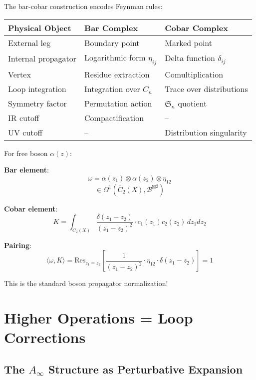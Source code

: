 \begin{theorem}
The bar-cobar construction encodes Feynman rules:

\begin{center}
\begin{tabular}{|l|l|l|}
\hline
\textbf{Physical Object} & \textbf{Bar Complex} & \textbf{Cobar Complex} \\
\hline
External leg & Boundary point & Marked point \\
Internal propagator & Logarithmic form $\eta_{ij}$ & Delta function $\delta_{ij}$ \\
Vertex & Residue extraction & Comultiplication \\
Loop integration & Integration over $C_n$ & Trace over distributions \\
Symmetry factor & Permutation action & $\mathfrak{S}_n$ quotient \\
IR cutoff & Compactification & -- \\
UV cutoff & -- & Distribution singularity \\
\hline
\end{tabular}
\end{center}
\end{theorem}

\begin{example}
For free boson $\alpha(z)$:

\textbf{Bar element}:
$$\omega = \alpha(z_1) \otimes \alpha(z_2) \otimes \eta_{12}$$
$$\in \Omega^1(\overline{C}_2(X), \mathcal{B}^{\boxtimes 2})$$

\textbf{Cobar element}:
$$K = \int_{C_2(X)} \frac{\delta(z_1-z_2)}{(z_1-z_2)^2} \cdot 
c_1(z_1) c_2(z_2) \, dz_1 dz_2$$

\textbf{Pairing}:
$$\langle \omega, K \rangle = \text{Res}_{z_1=z_2}\left[\frac{1}{(z_1-z_2)^2} 
\cdot \eta_{12} \cdot \delta(z_1-z_2)\right] = 1$$

This is the standard boson propagator normalization!
\end{example}

\section{Higher Operations = Loop Corrections}

\subsection{The $A_\infty$ Structure as Perturbative Expansion}

